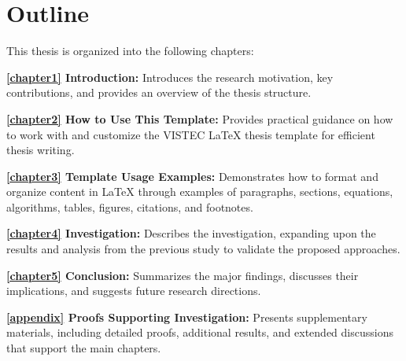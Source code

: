 \section{Outline}
\label{ch1:sec:outline}
\begin{paragraph}
This thesis is organized into the following chapters:

\textbf{\autoref{chapter1} Introduction:}  
Introduces the research motivation, key contributions, and provides an overview of the thesis structure.

\textbf{\autoref{chapter2} How to Use This Template:}  
Provides practical guidance on how to work with and customize the VISTEC {\LaTeX} thesis template for efficient thesis writing.

\textbf{\autoref{chapter3} Template Usage Examples:}  
Demonstrates how to format and organize content in {\LaTeX} through examples of paragraphs, sections, equations, algorithms, tables, figures, citations, and footnotes.

\textbf{\autoref{chapter4} Investigation:}  
Describes the investigation, expanding upon the results and analysis from the previous study to validate the proposed approaches.

\textbf{\autoref{chapter5} Conclusion:}  
Summarizes the major findings, discusses their implications, and suggests future research directions.

\textbf{\autoref{appendix} Proofs Supporting Investigation:}  
Presents supplementary materials, including detailed proofs, additional results, and extended discussions that support the main chapters.
\end{paragraph}
